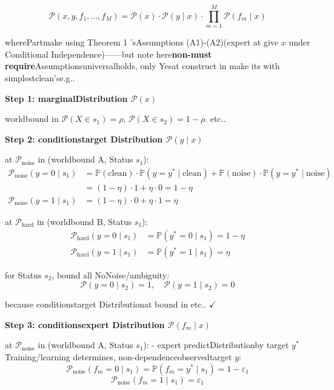 \documentclass[
  12pt,
]{article}
\begin{document}
\[\mathcal{P}(x, y, f_1, \dots, f_M) = \mathcal{P}(x) \cdot \mathcal{P}(y \mid x) \cdot \prod_{m=1}^M \mathcal{P}(f_m \mid x)\]

wherePartmake using  Theorem 1 'sAssumptions (A1)-(A2)(expert at give  \(x\)
under Conditional Independence)------but note here\textbf{non-must require}Assumptionsuniversalholds, only Yesat construct in make its with simplestclean'se.g.. 

\textbf{Step 1: marginalDistribution \(\mathcal{P}(x)\)}

worldbound in 
\(\mathcal{P}(X \in s_1) = \rho\), \(\mathcal{P}(X \in s_2) = 1 - \rho\). etc.. 

\textbf{Step 2: conditionstarget Distribution \(\mathcal{P}(y \mid x)\)}

at  \(\mathcal{P}_{\text{noise}}\) in (worldbound  A, Status \(s_1\)):
\[\begin{aligned}
\mathcal{P}_{\text{noise}}(y = 0 \mid s_1) &= \mathbb{P}(\text{clean}) \cdot \mathbb{P}(y = y^* \mid \text{clean}) + \mathbb{P}(\text{noise}) \cdot \mathbb{P}(y = y^* \mid \text{noise}) \\
&= (1 - \eta) \cdot 1 + \eta \cdot 0 = 1 - \eta \\
\mathcal{P}_{\text{noise}}(y = 1 \mid s_1) &= (1 - \eta) \cdot 0 + \eta \cdot 1 = \eta
\end{aligned}\]

at  \(\mathcal{P}_{\text{hard}}\) in (worldbound  B, Status \(s_1\)):
\[\begin{aligned}
\mathcal{P}_{\text{hard}}(y = 0 \mid s_1) &= \mathbb{P}(y^* = 0 \mid s_1) = 1 - \eta \\
\mathcal{P}_{\text{hard}}(y = 1 \mid s_1) &= \mathbb{P}(y^* = 1 \mid s_1) = \eta
\end{aligned}\]

for Status \(s_2\), bound all NoNoise/ambiguity: 
\[\mathcal{P}(y = 0 \mid s_2) = 1, \quad \mathcal{P}(y = 1 \mid s_2) = 0\]

because conditionstarget Distributionat bound in etc.. \(\checkmark\)

\textbf{Step 3: conditionsexpert Distribution \(\mathcal{P}(f_m \mid x)\)}

at  \(\mathcal{P}_{\text{noise}}\) in (worldbound  A, Status \(s_1\)): -
expert predictDistributionby target  \(y^*\) Training/learning determines, non-dependenceobservedtarget  \(y\): 
\[\mathcal{P}_{\text{noise}}(f_m = 0 \mid s_1) = \mathbb{P}(f_m = y^* \mid s_1) = 1 - \varepsilon_1\]
\[\mathcal{P}_{\text{noise}}(f_m = 1 \mid s_1) = \varepsilon_1\]
\end{document}
